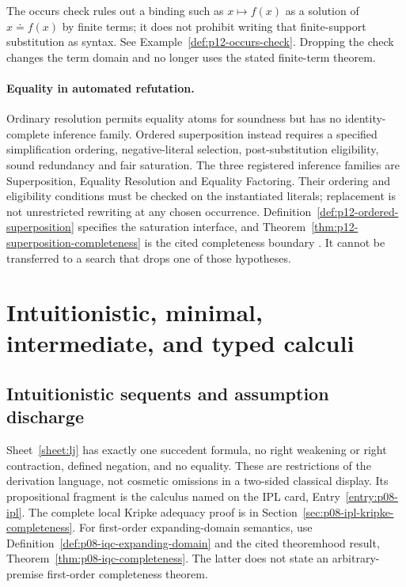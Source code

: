 The occurs check rules out a binding such as \(x\mapsto f(x)\) as a
solution of \(x\doteq f(x)\) by finite terms; it does not prohibit
writing that finite-support substitution as syntax.  See
Example~\ref{def:p12-occurs-check}.  Dropping the check changes the term
domain and no longer uses the stated finite-term theorem.


\paragraph{Equality in automated refutation.}
Ordinary resolution permits equality atoms for soundness but has no
identity-complete inference family.  Ordered superposition instead requires
a specified simplification ordering, negative-literal selection,
post-substitution eligibility, sound redundancy and fair saturation.
The three registered inference families are Superposition, Equality
Resolution and Equality Factoring.  Their ordering and eligibility
conditions must be checked on the instantiated literals; replacement is
not unrestricted rewriting at any chosen occurrence.
Definition~\ref{def:p12-ordered-superposition} specifies the saturation
interface, and Theorem~\ref{thm:p12-superposition-completeness} is the
cited completeness boundary \cite{BachmairGanzinger2001,NieuwenhuisRubio2001}.
It cannot be transferred to a search that drops one of those hypotheses.


\section{Intuitionistic, minimal, intermediate, and typed calculi}
\label{sec:p14-classical-calculi-constructive}

\subsection{Intuitionistic sequents and assumption discharge}

Sheet~\ref{sheet:lj} has exactly one succedent formula, no right weakening
or right contraction, defined negation, and no equality.  These are
restrictions of the derivation language, not cosmetic omissions in a
two-sided classical display.  Its propositional fragment is the calculus
named on the IPL card, Entry~\ref{entry:p08-ipl}.  The complete local
Kripke adequacy proof is in Section~\ref{sec:p08-ipl-kripke-completeness}.
For first-order expanding-domain semantics, use
Definition~\ref{def:p08-iqc-expanding-domain} and the cited theoremhood
result, Theorem~\ref{thm:p08-iqc-completeness}.  The latter does not state
an arbitrary-premise first-order completeness theorem.

